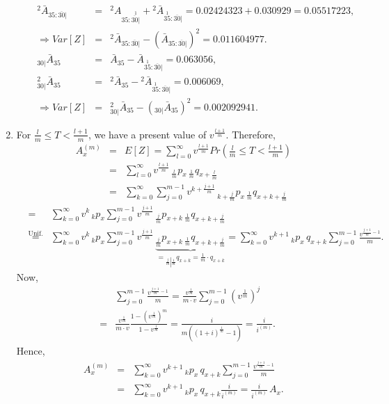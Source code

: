 \documentclass[11pt,fleqn,oneside]{book}
\begin{document}
\begin{enumerate}
\begin{enumerate}
\begin{eqnarray*}
 {^2\bar{A}_{35:\overline{30}|}} &=&  {^2A_{35:\stackrel{1}{\overline{30}|}}}  +  {^2\bar{A}_{\stackrel{1}{35}:\overline{30}|}} = 0.02424323 + 0.030929 = 0.05517223,\\
 \Rightarrow Var[Z] &=&  {^2\bar{A}_{35:\overline{30}|}}  - \left({\bar{A}_{35:\overline{30}|}} \right)^2
 = 0.011604977.\\
 {_{30|}\bar{A}_{35}} &=& {\bar{A}_{35}} -  {\bar{A}_{\stackrel{1}{35}:\overline{30}|}}  = 0.063056,\\
 {^2_{30|}\bar{A}_{35}} &=& {^2\bar{A}_{35}} -  {^2\bar{A}_{\stackrel{1}{35}:\overline{30}|}} = 0.006069, \\
 \Rightarrow Var[Z] &=&  {^2_{30|}\bar{A}_{35}}  - \left( {_{30|}\bar{A}_{35}} \right)^2 = 0.002092941.
\end{eqnarray*}
\end{enumerate}
\item For $\frac{l}{m} \leq T < \frac{l+1}{m}$, we have a present value of $v^{\frac{l+1}{m}}$. Therefore,
\begin{eqnarray*}
{A_x^{(m)}} &=& E[Z] = \sum_{l=0}^{\infty} v^{\frac{l+1}{m}} Pr\left(\frac{l}{m} \leq T < \frac{l+1}{m}\right) \\
&=& \sum_{l=0}^{\infty}  v^{\frac{l+1}{m}} \,{_{\frac{l}{m}}p_x}\,{_{\frac{1}{m}}q_{x+\frac{l}{m}}}\\
&=& \sum_{k=0}^{\infty} \sum_{j=0}^{m-1} v^{k+\frac{j+1}{m}} \,{_{k+\frac{j}{m}}p_x}\,{_{\frac{1}{m}}q_{x+k+\frac{j}{m}}}
 \end{eqnarray*}
 \begin{eqnarray*}
&=&\sum_{k=0}^{\infty}  v^{k} \,{_{k}p_x}\sum_{j=0}^{m-1} v^{\frac{j+1}{m}} \,{_{\frac{j}{m}}p_{x+k}}\,{_{\frac{1}{m}}q_{x+k+\frac{j}{m}}}\\
&\stackrel{\text{Unif.\ Ass.}}{=}&  \sum_{k=0}^{\infty}  v^{k} \,{_{k}p_x}\sum_{j=0}^{m-1} v^{\frac{j+1}{m}} \,\underbrace{{_{\frac{j}{m}}p_{x+k}}\,{_{\frac{1}{m}}q_{x+k+\frac{j}{m}}}}_{={_{\left.\frac{j}{m}\right|\frac{1}{m}}q_{x+k}}= \frac{1}{m}\cdot q_{x+k}} 
= \sum_{k=0}^{\infty}  v^{k+1} \,{_{k}p_x}\,{q_{x+k}}\sum_{j=0}^{m-1} \frac{v^{\frac{j+1}{m}-1}}{m}.
\end{eqnarray*} 
Now, 
\begin{eqnarray*}
&&\sum_{j=0}^{m-1} \frac{v^{\frac{j+1}{m}-1}}{m}
= \frac{v^{\frac{1}{m}}}{m \cdot v} \sum_{j=0}^{m-1} \left(v^{\frac{1}{m}}\right)^j\\
&=& \frac{v^{\frac{1}{m}}}{m \cdot v} \frac{1 - \left(v^{\frac{1}{m}}\right)^{m}}{1 - v^{\frac{1}{m}}}
= \frac{i}{m\left((1+i)^{\frac{1}{m}} - 1\right)} = \frac{i}{i^{(m)}}.
\end{eqnarray*}
Hence,
\begin{eqnarray*}
{A_x^{(m)}} &=&  \sum_{k=0}^{\infty}  v^{k+1} \,{_{k}p_x}\,{q_{x+k}}\sum_{j=0}^{m-1} \frac{v^{\frac{j+1}{m}-1}}{m}\\
&=& \sum_{k=0}^{\infty}  v^{k+1} \,{_{k}p_x}\,{q_{x+k}} \frac{i}{i^{(m)}}
= \frac{i}{i^{(m)}} \,{A_x}.
\end{eqnarray*}


\end{enumerate}
\end{document}
